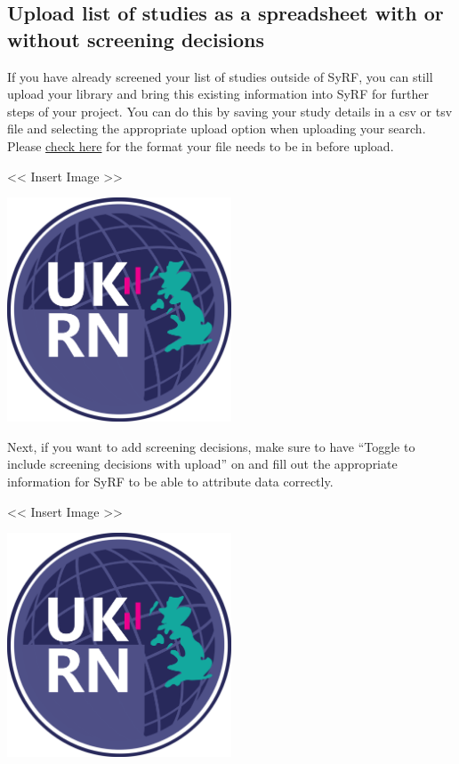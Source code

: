 \documentclass[
]{book}
\begin{document}
\hypertarget{upload-list-of-studies-as-a-spreadsheet-with-or-without-screening-decisions}{%
\subsection{Upload list of studies as a spreadsheet with or without screening decisions}\label{upload-list-of-studies-as-a-spreadsheet-with-or-without-screening-decisions}}

If you have already screened your list of studies outside of SyRF, you can still upload your library and bring this existing information into SyRF for further steps of your project. You can do this by saving your study details in a csv or tsv file and selecting the appropriate upload option when uploading your search. Please \href{https://app.syrf.org.uk/assets/pdfs/Systematic\%20search\%20instructions.pdf}{check here} for the format your file needs to be in before upload.

\textless{}\textless{} Insert Image \textgreater{}\textgreater{}

\includegraphics[width=0.5\textwidth,height=0.5\textheight]{figs/evidence-triangle.png}

Next, if you want to add screening decisions, make sure to have ``Toggle to include screening decisions with upload'' on and fill out the appropriate information for SyRF to be able to attribute data correctly.

\textless{}\textless{} Insert Image \textgreater{}\textgreater{}

\includegraphics[width=0.5\textwidth,height=0.5\textheight]{figs/evidence-triangle.png}
\end{document}
